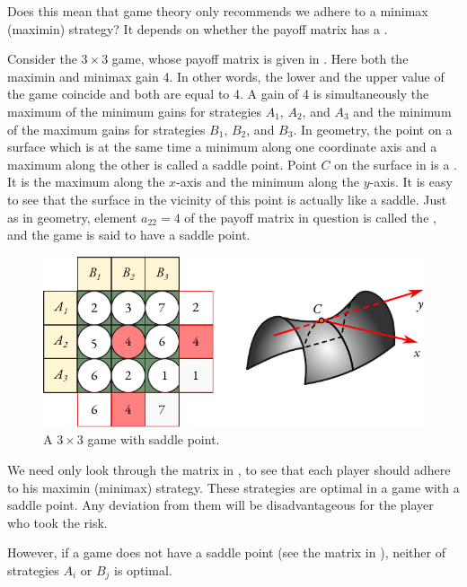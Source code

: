 Does this mean that game theory only recommends we adhere to
a minimax (maximin) strategy? It depends on whether the payoff matrix
has a .

 Consider the $3 \times 3$ game, whose payoff matrix is given in . Here both the maximin and minimax gain 4. In other words, the lower and the upper value of the game coincide and both are equal to 4. A gain of 4 is simultaneously the maximum of
the minimum gains for strategies $A_{1}, \, A_{2}$, and $A_{3}$ and the minimum of the maximum gains for strategies $B_{1}, \, B_{2}$, and $B_{3}$. In geometry, the point on a surface which is at the same time a minimum along one coordinate axis and a maximum along the other is called a saddle point. Point $C$ on the surface in  is a . It is the maximum along the $x$-axis and the minimum along the $y$-axis. It is easy to see that the surface in the vicinity of this point is actually like a saddle. Just as in geometry, element $a_{22} = 4$ of the payoff matrix in question is called the
, and the game is said to have a saddle point.

 \begin{figure}[!h]
 \centering
 \includegraphics[width=\tfwidth]{figures/saddle-point.pdf}
\caption{A $3 \times 3$ game with saddle point.\label{saddle-point}}
 \end{figure}
We need only look through the matrix in , to see that each player should adhere to his maximin (minimax) strategy. These strategies
are optimal in a game with a saddle point. Any deviation from them will
be disadvantageous for the player who took the risk.

However, if a game does not have a saddle point (see the matrix in
), neither of strategies $A_{i}$ or $B_{j}$ is optimal.


